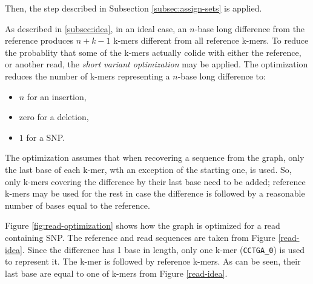 Then, the step described in Subsection \ref{subsec:assign-sets} is applied.

As described in \ref{subsec:idea}, in an ideal case, an $n$-base long difference from the reference produces $n + k - 1$ k-mers different from all reference k-mers. To reduce the probablity that some of the k-mers actually colide with either the reference, or another read, the \textit{short variant optimization} may be applied. The optimization reduces the number of k-mers representing a $n$-base long difference to:
\begin{itemize}
\item $n$ for an insertion,
\item zero for a deletion,
\item $1$ for a SNP.
\end{itemize}

The optimization assumes that when recovering a sequence from the graph, only the last base of each k-mer, wth an exception of the starting one, is used. So, only k-mers covering the difference by their last base need to be added; reference k-mers may be used for the rest in case the difference is followed by a reasonable number of bases equal to the reference. 

Figure \ref{fig:read-optimization} shows how the graph is optimized for a read containing SNP. The reference and read sequences are taken from Figure \ref{read-idea}. Since the difference has 1 base in length, only one k-mer (\texttt{CCTGA\_0}) is used to represent it. The k-mer is followed by reference k-mers. As can be seen, their last base are equal to one of k-mers from Figure \ref{read-idea}.

